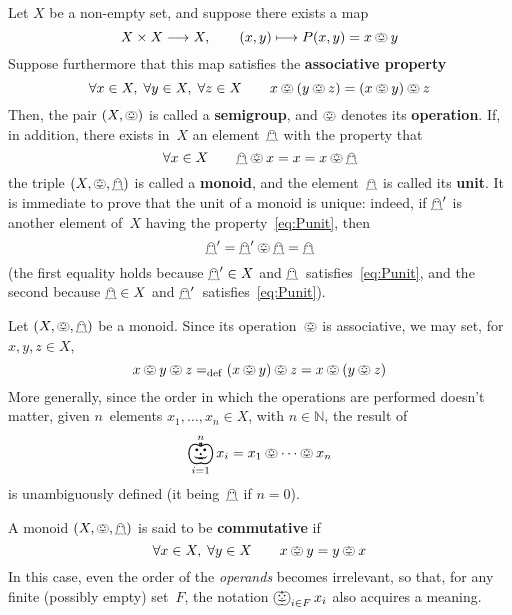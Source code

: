 \documentclass[a4paper]{article}
\begin{document}
Let $X$ be a non-empty set, and suppose there exists a map
\begin{equation}
	X\times X\longrightarrow X,\qquad
	(x,y)\longmapsto P(x,y)=x\pumpkin y
	\label{eq:Pdef}
\end{equation}
Suppose furthermore that this map satisfies the \textbf{associative property}
\begin{equation}
	\forall x\in X,\;\forall y\in X,\;\forall z\in X\qquad
	x\pumpkin(y\pumpkin z) = (x\pumpkin y)\pumpkin z
	\label{eq:Passoc}
\end{equation}
Then, the pair $(X,\pumpkin)$ is called a \textbf{semigroup}, and $\pumpkin$
denotes its \textbf{operation}.  If, in addition, there exists in~$X$ an
element~$\mathghost$ with the property that
\begin{equation}
	\forall x\in X\qquad
	\mathghost\pumpkin x = x = x\pumpkin\mathghost
	\label{eq:Punit}
\end{equation}
the triple $(X,\pumpkin,\mathghost)$ is called a \textbf{monoid}, and the
element~$\mathghost$ is called its \textbf{unit}.  It is immediate to prove that
the unit of a monoid is unique: indeed, if $\mathghost'$ is another element
of~$X$ having the property~\eqref{eq:Punit}, then
\[
	\mathghost' = \mathghost'\pumpkin\mathghost = \mathghost
\]
(the first equality holds because \( \mathghost'\in X \) and
$\mathghost$~satisfies~\eqref{eq:Punit}, and the second because \( \mathghost\in
X \) and $\mathghost'$~satisfies~\eqref{eq:Punit}).

Let $(X,\pumpkin,\mathghost)$ be a monoid.  Since its operation~$\pumpkin$ is
associative, we may set, for \( x,y,z\in X \),
\[
	x\pumpkin y\pumpkin z =_{\mathrm{def}}
		(x\pumpkin y)\pumpkin z = x\pumpkin (y\pumpkin z)
\]
More generally, since the order in which the operations are performed doesn't
matter, given $n$~elements \( x_{1},\dots,x_{n} \in X \), with \( n \in
\mathbb{N} \), the result of
\[
	\bigpumpkin_{i=1}^{n} x_{i} = x_{1}\pumpkin\dots\pumpkin x_{n}
\]
is unambiguously defined (it being~$\mathghost$ if \( n=0 \)).

A monoid $(X,\pumpkin,\mathghost)$ is said to be \textbf{commutative} if
\begin{equation}
	\forall x\in X,\;\forall y\in X\qquad
	x\pumpkin y = y\pumpkin x
	\label{eq:Pcomm}
\end{equation}
In this case, even the order of the \emph{operands} becomes irrelevant, so that,
for any finite (possibly empty) set~$F$, the notation \( \bigpumpkin_{i\in F}
x_{i} \) also acquires a meaning.
\end{document}
